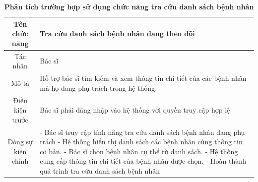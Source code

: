 \begin{table}[H]
	\caption{\bfseries \fontsize{12pt}{0pt}\selectfont Phân tích trường hợp sử dụng chức năng tra cứu danh sách bệnh nhân}
	\centering
	\begin{tabularx}{0.9\textwidth}{|c|X|}
		\hline
		\textbf{Tên chức năng} & \textbf{Tra cứu danh sách bệnh nhân đang theo dõi}                                                      \\
		\hline
		Tác nhân               & Bác sĩ                                                                                                  \\
		\hline
		Mô tả                  & Hỗ trợ bác sĩ tìm kiếm và xem thông tin chi tiết của các bệnh nhân mà họ đang phụ trách trong hệ thống. \\
		\hline
		Điều kiện trước        & Bác sĩ phải đăng nhập vào hệ thống với quyền truy cập hợp lệ                                            \\
		\hline
		Dòng sự kiện chính     &
		- Bác sĩ truy cập tính năng tra cứu danh sách bệnh nhân đang phụ trách \newline
		- Hệ thống hiển thị danh sách các bệnh nhân cùng thông tin cơ bản. \newline
		- Bác sĩ chọn bệnh nhân cụ thể từ danh sách. \newline
		- Hệ thống cung cấp thông tin chi tiết của bệnh nhân được chọn. \newline
		- Hoàn thành quá trình tra cứu danh sách bệnh nhân                                                                               \\
		\hline
	\end{tabularx}
\end{table}

